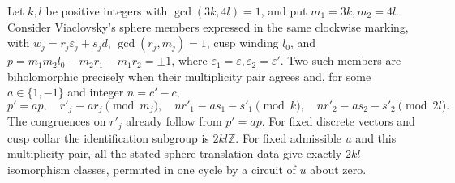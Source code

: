 \begin{proposition}\label{fam:src:B.3.1}\label{fam:st:B.3.1}
Let $k,l$ be positive integers with $\gcd(3k,4l)=1$, and put $m_1=3k,m_2=4l$. Consider Viaclovsky's sphere members expressed in the same clockwise marking, with $w_j=r_j\varepsilon_j+s_jd$, $\gcd(r_j,m_j)=1$, cusp winding $l_0$, and $p=m_1m_2l_0-m_2r_1-m_1r_2=\pm1$, where $\varepsilon_1=\varepsilon,\varepsilon_2=\varepsilon'$. Two such members are biholomorphic precisely when their multiplicity pair agrees and, for some $a\in\{1,-1\}$ and integer $n=c'-c$,
\[
 p'=ap,\quad r'_j\equiv ar_j\pmod{m_j},\quad
 nr'_1\equiv as_1-s'_1\pmod{k},\quad
 nr'_2\equiv as_2-s'_2\pmod{2l}.
\]
The congruences on $r'_j$ already follow from $p'=ap$. For fixed discrete vectors and cusp collar the identification subgroup is $2kl\mathbb Z$. For fixed admissible $u$ and this multiplicity pair, all the stated sphere translation data give exactly $2kl$ isomorphism classes, permuted in one cycle by a circuit of $u$ about zero.
\end{proposition}

